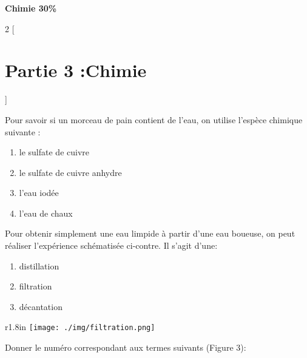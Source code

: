 \documentclass[12pt]{article}
\begin{document}
\begin{center}

\vspace{4cm}
\hrulefill
\textbf{Chimie 30\%}
\hrulefill


\end{center}
\begin{multicols}{2}
    [
        \section*{Partie 3 :Chimie}
    ]
	\begin{enumerate}
		\item Pour savoir si un morceau de pain contient de l’eau, on utilise l’espèce
chimique suivante :
\begin{enumerate}
	\item le sulfate de cuivre
	\item le sulfate de cuivre anhydre
	\item l’eau iodée
	\item l’eau de chaux
\end{enumerate}
\item Pour obtenir simplement une eau limpide à partir d’une eau boueuse, on
peut réaliser l’expérience schématisée ci-contre. Il s’agit
d’une:
\begin{enumerate}
	\item distillation
	\item filtration
	\item décantation
\end{enumerate}

\begin{minipage}{\linewidth} 
\begin{wrapfigure}{r}{1.8in} 
\vspace{-12pt} 
\texttt{[image: ./img/filtration.png]}
\vspace{-1cm}
\caption{}
\end{wrapfigure} 

\item Donner le numéro correspondant aux termes suivants (Figure 3):


\end{minipage}
\end{enumerate}
\end{multicols}
\end{document}
